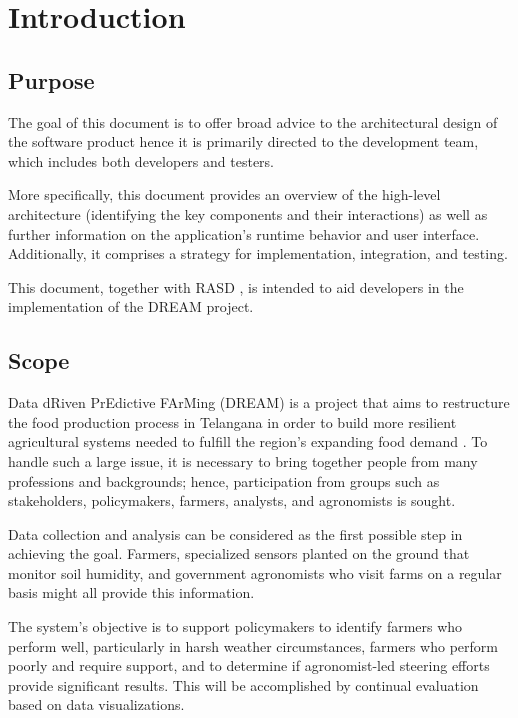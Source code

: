 \chapter{Introduction}

\section{Purpose}

The goal of this document is to offer broad advice to the architectural design of the software product hence it is primarily directed to the development team, which includes both developers and testers.

More specifically, this document provides an overview of the high-level architecture (identifying the key components and their interactions) as well as further information on the application's runtime behavior and user interface. Additionally, it comprises a strategy for implementation, integration, and testing.

This document, together with RASD \cite{rasd}, is intended to aid developers in the implementation of the DREAM project.

\section{Scope}

Data dRiven PrEdictive FArMing (DREAM) is a project that aims to restructure the food production process in Telangana in order to build more resilient agricultural systems needed to fulfill the region's expanding food demand \cite{reference_doc}. To handle such a large issue, it is necessary to bring together people from many professions and backgrounds; hence, participation from groups such as stakeholders, policymakers, farmers, analysts, and agronomists is sought.

Data collection and analysis can be considered as the first possible step in achieving the goal. Farmers, specialized sensors planted on the ground that monitor soil humidity, and government agronomists who visit farms on a regular basis might all provide this information.

The system's objective is to support policymakers to identify farmers who perform well, particularly in harsh weather circumstances, farmers who perform poorly and require support, and to determine if agronomist-led steering efforts provide significant results. This will be accomplished by continual evaluation based on data visualizations.


